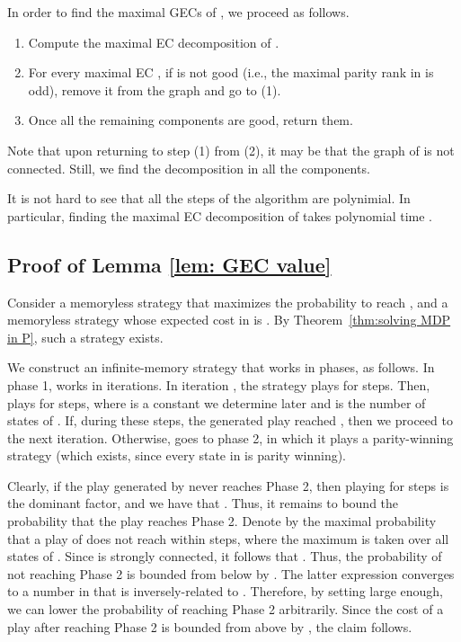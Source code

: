 \documentclass[runningheads,a4paper]{llncs}
\newcommand{\gecs}{{GECs}\xspace}
\begin{document}
In order to find the maximal \gecs of , we proceed as follows. 
\begin{enumerate}
\item Compute the maximal EC decomposition of .
\item For every maximal EC , if  is not good (i.e., the maximal parity rank in  is odd), remove it from the graph  and go to (1).
\item Once all the remaining components are good, return them.
\end{enumerate}
Note that upon returning to step (1) from (2), it may be that the graph of  is not connected. Still, we find the decomposition in all the components.

It is not hard to see that all the steps of the algorithm are polynimial. In particular, finding the maximal EC decomposition of  takes polynomial time \cite{CH14}.

\subsection{Proof of Lemma \ref{lem: GEC value}}

Consider a memoryless strategy  that maximizes the probability to reach , and a memoryless strategy  whose expected cost in  is . By Theorem~\ref{thm:solving MDP in P}, such a strategy  exists.

We construct an infinite-memory strategy  that works in phases, as follows. In phase 1,  works in iterations. In iteration , the strategy  plays  for  steps. Then,  plays  for  steps, where  is a constant we determine later and  is the number of states of . If, during these  steps, the generated play reached , then we proceed to the next iteration. Otherwise,  goes to phase 2, in which it plays a parity-winning strategy (which exists, since every state in  is parity winning).

Clearly, if the play generated by  never reaches Phase 2, then playing  for  steps is the dominant factor, and we have that . Thus, it remains to bound the probability that the play reaches Phase 2. 
Denote by  the maximal probability that a play of  does not reach  within  steps, where the maximum is taken over all states of . Since  is strongly connected, it follows that . Thus, the probability of not reaching Phase 2 is bounded from below by . The latter expression converges to a number  in  that is 
inversely-related to . Therefore, by setting  large enough, we can lower the probability of reaching Phase 2 arbitrarily. Since the cost of a play after reaching Phase 2 is bounded from above by , the claim follows.
\end{document}
